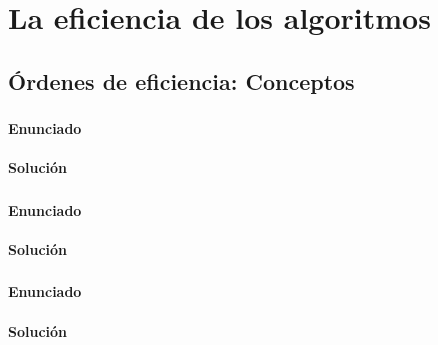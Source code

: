 \chapter{La eficiencia de los algoritmos}

\section{Órdenes de eficiencia: Conceptos}

\subsection{}\label{ej1-1-1}

\subsubsection{Enunciado}

\subsubsection{Solución}

\subsection{}\label{ej1-1-2}

\subsubsection{Enunciado}

\subsubsection{Solución}

\subsection{}\label{ej1-1-3}

\subsubsection{Enunciado}

\subsubsection{Solución}

\subsection{}\label{ej1-1-4}

